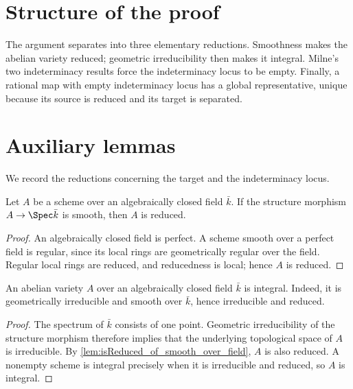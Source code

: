 \section{Structure of the proof}
\label{sec:thm32_lean_encoding}

The argument separates into three elementary reductions.  Smoothness makes
the abelian variety reduced; geometric irreducibility then makes it
integral.  Milne's two indeterminacy results force the indeterminacy locus to
be empty.  Finally, a rational map with empty indeterminacy locus has a
global representative, unique because its source is reduced and its target
is separated.

\section{Auxiliary lemmas}
\label{sec:thm32_lean_helpers}

We record the reductions concerning the target and the indeterminacy locus.

\begin{lemma}\leanok
  \label{lem:isReduced_of_smooth_over_field}
  Let \(A\) be a scheme over an algebraically closed field \(\bar k\).  If
  the structure morphism \(A\to\Spec\bar k\) is smooth, then \(A\) is
  reduced.
\end{lemma}
\begin{proof}
  An algebraically closed field is perfect.  A scheme smooth over a
  perfect field is regular, since its local rings are geometrically
  regular over the field.  Regular local rings are reduced, and
  reducedness is local; hence \(A\) is reduced.
\end{proof}

\begin{lemma}\leanok
  \label{lem:av_isIntegral_of_smooth_geomIrred}
  An abelian variety \(A\) over an algebraically closed field \(\bar k\) is
  integral.  Indeed, it is geometrically irreducible and smooth over
  \(\bar k\), hence irreducible and reduced.
\end{lemma}
\begin{proof}
  The spectrum of \(\bar k\) consists of one point.  Geometric
  irreducibility of the structure morphism therefore implies that the
  underlying topological space of \(A\) is irreducible.  By
  \cref{lem:isReduced_of_smooth_over_field}, \(A\) is also reduced.  A
  nonempty scheme is integral precisely when it is irreducible and
  reduced, so \(A\) is integral.
\end{proof}

